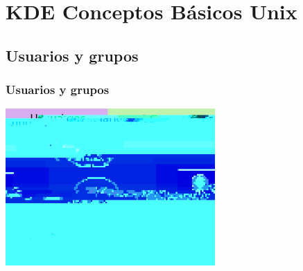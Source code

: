 \section{KDE Conceptos Básicos Unix}
\subsection{Usuarios y grupos}
\frame
{
	\frametitle{Usuarios y grupos}
	\begin{center}
		\includegraphics[width=8cm]{./imgs/usuarios-grupos}
	\end{center}
}
